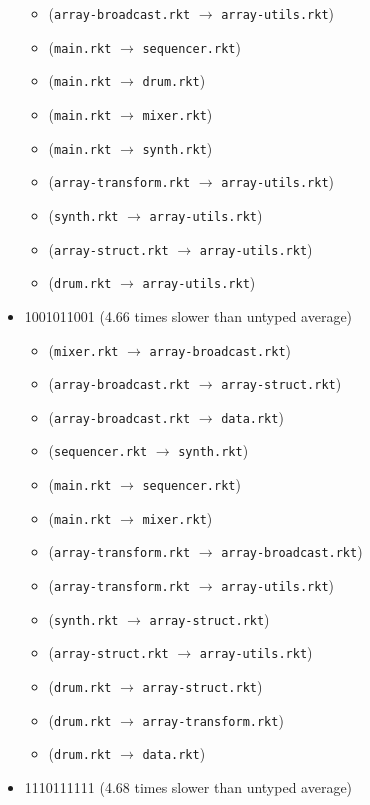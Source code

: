 \documentclass{article}
\newcommand{\mono}[1]{\texttt{#1}}
\begin{document}
\begin{itemize}
\begin{itemize}
  \item (\mono{array-broadcast.rkt} $\rightarrow$ \mono{array-utils.rkt})
  \item (\mono{main.rkt} $\rightarrow$ \mono{sequencer.rkt})
  \item (\mono{main.rkt} $\rightarrow$ \mono{drum.rkt})
  \item (\mono{main.rkt} $\rightarrow$ \mono{mixer.rkt})
  \item (\mono{main.rkt} $\rightarrow$ \mono{synth.rkt})
  \item (\mono{array-transform.rkt} $\rightarrow$ \mono{array-utils.rkt})
  \item (\mono{synth.rkt} $\rightarrow$ \mono{array-utils.rkt})
  \item (\mono{array-struct.rkt} $\rightarrow$ \mono{array-utils.rkt})
  \item (\mono{drum.rkt} $\rightarrow$ \mono{array-utils.rkt})
  \end{itemize}
\item 1001011001 (4.66 times slower than untyped average)
  \begin{itemize}
  \item (\mono{mixer.rkt} $\rightarrow$ \mono{array-broadcast.rkt})
  \item (\mono{array-broadcast.rkt} $\rightarrow$ \mono{array-struct.rkt})
  \item (\mono{array-broadcast.rkt} $\rightarrow$ \mono{data.rkt})
  \item (\mono{sequencer.rkt} $\rightarrow$ \mono{synth.rkt})
  \item (\mono{main.rkt} $\rightarrow$ \mono{sequencer.rkt})
  \item (\mono{main.rkt} $\rightarrow$ \mono{mixer.rkt})
  \item (\mono{array-transform.rkt} $\rightarrow$ \mono{array-broadcast.rkt})
  \item (\mono{array-transform.rkt} $\rightarrow$ \mono{array-utils.rkt})
  \item (\mono{synth.rkt} $\rightarrow$ \mono{array-struct.rkt})
  \item (\mono{array-struct.rkt} $\rightarrow$ \mono{array-utils.rkt})
  \item (\mono{drum.rkt} $\rightarrow$ \mono{array-struct.rkt})
  \item (\mono{drum.rkt} $\rightarrow$ \mono{array-transform.rkt})
  \item (\mono{drum.rkt} $\rightarrow$ \mono{data.rkt})
  \end{itemize}
\item 1110111111 (4.68 times slower than untyped average)

\end{itemize}
\end{document}
